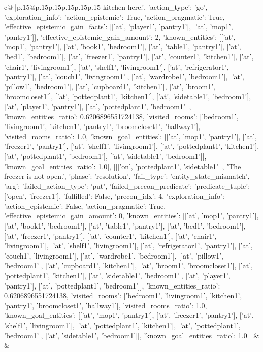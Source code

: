 \documentclass{article}
\begin{document}
{\begin{supertabular}{c@{$\;$}|p{.15\linewidth}@{}p{.15\linewidth}p{.15\linewidth}p{.15\linewidth}p{.15\linewidth}p{.15\linewidth}}
{{{kitchen here.', {'action_type': 'go', 'exploration_info': {'action_epistemic': True, 'action_pragmatic': True, 'effective_epistemic_gain_facts': [['at', 'player1', 'pantry1'], ['at', 'mop1', 'pantry1']], 'effective_epistemic_gain_amount': 2, 'known_entities': [['at', 'mop1', 'pantry1'], ['at', 'book1', 'bedroom1'], ['at', 'table1', 'pantry1'], ['at', 'bed1', 'bedroom1'], ['at', 'freezer1', 'pantry1'], ['at', 'counter1', 'kitchen1'], ['at', 'chair1', 'livingroom1'], ['at', 'shelf1', 'livingroom1'], ['at', 'refrigerator1', 'pantry1'], ['at', 'couch1', 'livingroom1'], ['at', 'wardrobe1', 'bedroom1'], ['at', 'pillow1', 'bedroom1'], ['at', 'cupboard1', 'kitchen1'], ['at', 'broom1', 'broomcloset1'], ['at', 'pottedplant1', 'kitchen1'], ['at', 'sidetable1', 'bedroom1'], ['at', 'player1', 'pantry1'], ['at', 'pottedplant1', 'bedroom1']], 'known_entities_ratio': 0.6206896551724138, 'visited_rooms': ['bedroom1', 'livingroom1', 'kitchen1', 'pantry1', 'broomcloset1', 'hallway1'], 'visited_rooms_ratio': 1.0, 'known_goal_entities': [['at', 'mop1', 'pantry1'], ['at', 'freezer1', 'pantry1'], ['at', 'shelf1', 'livingroom1'], ['at', 'pottedplant1', 'kitchen1'], ['at', 'pottedplant1', 'bedroom1'], ['at', 'sidetable1', 'bedroom1']], 'known_goal_entities_ratio': 1.0}}], [[['on', 'pottedplant1', 'sidetable1']], 'The freezer is not open.', {'phase': 'resolution', 'fail_type': 'entity_state_mismatch', 'arg': {'failed_action_type': 'put', 'failed_precon_predicate': {'predicate_tuple': ['open', 'freezer1'], 'fulfilled': False, 'precon_idx': 4}}, 'exploration_info': {'action_epistemic': False, 'action_pragmatic': True, 'effective_epistemic_gain_amount': 0, 'known_entities': [['at', 'mop1', 'pantry1'], ['at', 'book1', 'bedroom1'], ['at', 'table1', 'pantry1'], ['at', 'bed1', 'bedroom1'], ['at', 'freezer1', 'pantry1'], ['at', 'counter1', 'kitchen1'], ['at', 'chair1', 'livingroom1'], ['at', 'shelf1', 'livingroom1'], ['at', 'refrigerator1', 'pantry1'], ['at', 'couch1', 'livingroom1'], ['at', 'wardrobe1', 'bedroom1'], ['at', 'pillow1', 'bedroom1'], ['at', 'cupboard1', 'kitchen1'], ['at', 'broom1', 'broomcloset1'], ['at', 'pottedplant1', 'kitchen1'], ['at', 'sidetable1', 'bedroom1'], ['at', 'player1', 'pantry1'], ['at', 'pottedplant1', 'bedroom1']], 'known_entities_ratio': 0.6206896551724138, 'visited_rooms': ['bedroom1', 'livingroom1', 'kitchen1', 'pantry1', 'broomcloset1', 'hallway1'], 'visited_rooms_ratio': 1.0, 'known_goal_entities': [['at', 'mop1', 'pantry1'], ['at', 'freezer1', 'pantry1'], ['at', 'shelf1', 'livingroom1'], ['at', 'pottedplant1', 'kitchen1'], ['at', 'pottedplant1', 'bedroom1'], ['at', 'sidetable1', 'bedroom1']], 'known_goal_entities_ratio': 1.0}}]] 
	  } 
	   } 
	   } 
	 & & \\ 
 


\end{supertabular}}
\end{document}
